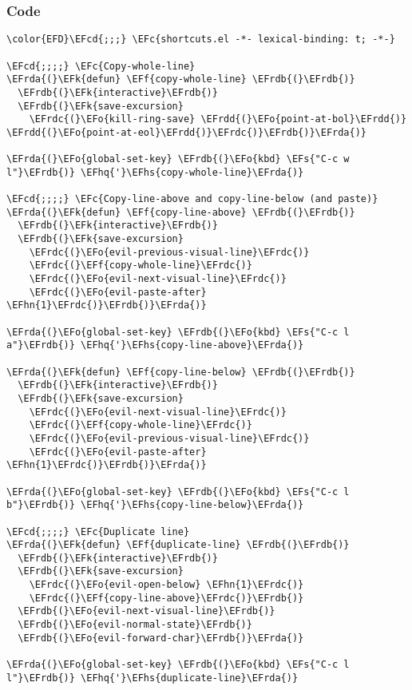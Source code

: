 \documentclass[a4wide,10pt]{article}
\newcommand{\EFc}[1]{\textcolor{EFc}{#1}} %
\newcommand{\EFcd}[1]{\textcolor{EFcd}{#1}} %
\newcommand{\EFs}[1]{\textcolor{EFs}{#1}} %
\newcommand{\EFk}[1]{\textcolor{EFk}{#1}} %
\newcommand{\EFf}[1]{\textcolor{EFf}{#1}} %
\newcommand{\EFo}[1]{\textcolor{EFo}{#1}} %
\newcommand{\EFhn}[1]{\textcolor{EFhn}{\textbf{#1}}} %
\newcommand{\EFhq}[1]{\textcolor{EFhq}{#1}} %
\newcommand{\EFhs}[1]{\textcolor{EFhs}{#1}} %
\newcommand{\EFrda}[1]{\textcolor{EFrda}{#1}} %
\newcommand{\EFrdb}[1]{\textcolor{EFrdb}{#1}} %
\newcommand{\EFrdc}[1]{\textcolor{EFrdc}{#1}} %
\newcommand{\EFrdd}[1]{\textcolor{EFrdd}{#1}} %
\begin{document}
\subsubsection{Code}
\label{sec:org4f9e2e7}
\begin{Code}
\begin{Verbatim}
\color{EFD}\EFcd{;;;} \EFc{shortcuts.el -*- lexical-binding: t; -*-}

\EFcd{;;;;} \EFc{Copy-whole-line}
\EFrda{(}\EFk{defun} \EFf{copy-whole-line} \EFrdb{(}\EFrdb{)}
  \EFrdb{(}\EFk{interactive}\EFrdb{)}
  \EFrdb{(}\EFk{save-excursion}
    \EFrdc{(}\EFo{kill-ring-save} \EFrdd{(}\EFo{point-at-bol}\EFrdd{)} \EFrdd{(}\EFo{point-at-eol}\EFrdd{)}\EFrdc{)}\EFrdb{)}\EFrda{)}

\EFrda{(}\EFo{global-set-key} \EFrdb{(}\EFo{kbd} \EFs{"C-c w l"}\EFrdb{)} \EFhq{'}\EFhs{copy-whole-line}\EFrda{)}

\EFcd{;;;;} \EFc{Copy-line-above and copy-line-below (and paste)}
\EFrda{(}\EFk{defun} \EFf{copy-line-above} \EFrdb{(}\EFrdb{)}
  \EFrdb{(}\EFk{interactive}\EFrdb{)}
  \EFrdb{(}\EFk{save-excursion}
    \EFrdc{(}\EFo{evil-previous-visual-line}\EFrdc{)}
    \EFrdc{(}\EFf{copy-whole-line}\EFrdc{)}
    \EFrdc{(}\EFo{evil-next-visual-line}\EFrdc{)}
    \EFrdc{(}\EFo{evil-paste-after} \EFhn{1}\EFrdc{)}\EFrdb{)}\EFrda{)}

\EFrda{(}\EFo{global-set-key} \EFrdb{(}\EFo{kbd} \EFs{"C-c l a"}\EFrdb{)} \EFhq{'}\EFhs{copy-line-above}\EFrda{)}

\EFrda{(}\EFk{defun} \EFf{copy-line-below} \EFrdb{(}\EFrdb{)}
  \EFrdb{(}\EFk{interactive}\EFrdb{)}
  \EFrdb{(}\EFk{save-excursion}
    \EFrdc{(}\EFo{evil-next-visual-line}\EFrdc{)}
    \EFrdc{(}\EFf{copy-whole-line}\EFrdc{)}
    \EFrdc{(}\EFo{evil-previous-visual-line}\EFrdc{)}
    \EFrdc{(}\EFo{evil-paste-after} \EFhn{1}\EFrdc{)}\EFrdb{)}\EFrda{)}

\EFrda{(}\EFo{global-set-key} \EFrdb{(}\EFo{kbd} \EFs{"C-c l b"}\EFrdb{)} \EFhq{'}\EFhs{copy-line-below}\EFrda{)}

\EFcd{;;;;} \EFc{Duplicate line}
\EFrda{(}\EFk{defun} \EFf{duplicate-line} \EFrdb{(}\EFrdb{)}
  \EFrdb{(}\EFk{interactive}\EFrdb{)}
  \EFrdb{(}\EFk{save-excursion}
    \EFrdc{(}\EFo{evil-open-below} \EFhn{1}\EFrdc{)}
    \EFrdc{(}\EFf{copy-line-above}\EFrdc{)}\EFrdb{)}
  \EFrdb{(}\EFo{evil-next-visual-line}\EFrdb{)}
  \EFrdb{(}\EFo{evil-normal-state}\EFrdb{)}
  \EFrdb{(}\EFo{evil-forward-char}\EFrdb{)}\EFrda{)}

\EFrda{(}\EFo{global-set-key} \EFrdb{(}\EFo{kbd} \EFs{"C-c l l"}\EFrdb{)} \EFhq{'}\EFhs{duplicate-line}\EFrda{)}


\end{Verbatim}
\end{Code}
\end{document}
